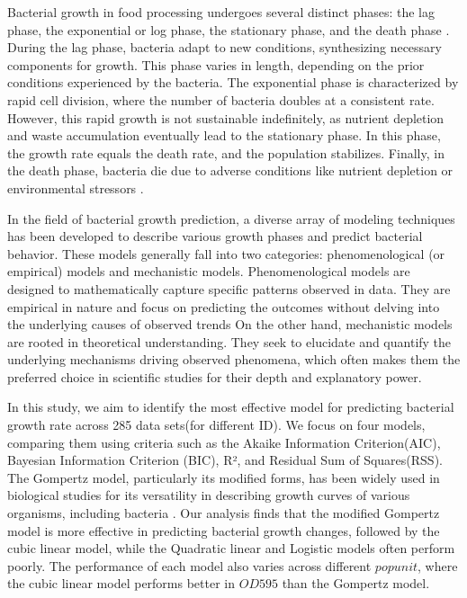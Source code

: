 \documentclass[11pt]{article}
\begin{document}
Bacterial growth in food processing undergoes several distinct phases: the lag phase, the exponential or log phase, the stationary phase, and the death phase \cite{Skarstad1983}. During the lag phase, bacteria adapt to new conditions, synthesizing necessary components for growth. This phase varies in length, depending on the prior conditions experienced by the bacteria. The exponential phase is characterized by rapid cell division, where the number of bacteria doubles at a consistent rate.\cite{Novick1955} However, this rapid growth is not sustainable indefinitely, as nutrient depletion and waste accumulation eventually lead to the stationary phase. In this phase, the growth rate equals the death rate, and the population stabilizes. Finally, in the death phase, bacteria die due to adverse conditions like nutrient depletion or environmental stressors \cite{Novick1955}.

In the field of bacterial growth prediction, a diverse array of modeling techniques has been developed to describe various growth phases and predict bacterial behavior. These models generally fall into two categories: phenomenological (or empirical) models and mechanistic models. Phenomenological models are designed to mathematically capture specific patterns observed in data. They are empirical in nature and focus on predicting the outcomes without delving into the underlying causes of observed trends \cite{vlazaki_integrating_2019}
On the other hand, mechanistic models are rooted in theoretical understanding. They seek to elucidate and quantify the underlying mechanisms driving observed phenomena, which often makes them the preferred choice in scientific studies for their depth and explanatory power.

In this study, we aim to identify the most effective model for predicting bacterial growth rate across 285 data sets(for different ID). We focus on four models, comparing them using criteria such as the Akaike Information Criterion(AIC), Bayesian Information Criterion (BIC), R², and Residual Sum of Squares(RSS). The Gompertz model, particularly its modified forms, has been widely used in biological studies for its versatility in describing growth curves of various organisms, including bacteria \cite{Zwietering1990}. Our analysis finds that the modified Gompertz model is more effective in predicting bacterial growth changes, followed by the cubic linear model, while the Quadratic linear and Logistic models often perform poorly. The performance of each model also varies across different $popunit$, where the cubic linear model performs better in $OD595$ than the Gompertz model.
\end{document}
